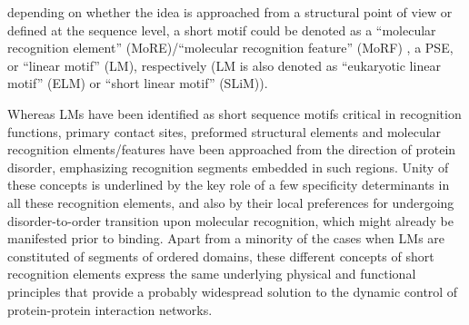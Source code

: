 depending
on whether the idea is approached from a structural point of view
or defined at the sequence level, a short motif could be denoted
as a “molecular recognition element” (MoRE)/“molecular
recognition feature” (MoRF) , a PSE, or “linear motif” (LM),
respectively (LM is also denoted as “eukaryotic linear motif”
(ELM) or “short linear motif” (SLiM)).


Whereas LMs have been identified as short sequence motifs critical in recognition functions, primary contact sites, preformed structural elements and molecular recognition elments/features have been approached from the direction of protein disorder, emphasizing recognition segments embedded in such regions. Unity of these concepts is underlined by the key role of a few specificity determinants in all these recognition elements, and also by their local preferences for undergoing disorder-to-order transition upon molecular recognition, which might already
be manifested prior to binding. 
Apart from a minority of the cases when LMs are constituted of segments of ordered domains, these different concepts of short recognition elements express the same underlying physical and
functional principles that provide a probably widespread solution to the dynamic control of protein-protein interaction networks.






